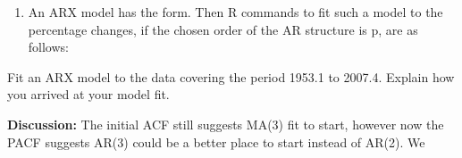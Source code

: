 \documentclass[
]{article}
\newenvironment{Shaded}{\begin{snugshade}}{\end{snugshade}}
\newcommand{\DecValTok}[1]{\textcolor[rgb]{0.00,0.00,0.81}{#1}}
\newcommand{\FunctionTok}[1]{\textcolor[rgb]{0.00,0.00,0.00}{#1}}
\newcommand{\NormalTok}[1]{#1}
\newcommand{\OtherTok}[1]{\textcolor[rgb]{0.56,0.35,0.01}{#1}}
\newcommand{\SpecialCharTok}[1]{\textcolor[rgb]{0.00,0.00,0.00}{#1}}
\providecommand{\tightlist}{%
  \setlength{\itemsep}{0pt}\setlength{\parskip}{0pt}}
\begin{document}
\begin{Shaded}
\end{Shaded}

\begin{enumerate}
\def\labelenumi{(\roman{enumi})}
\setcounter{enumi}{2}
\tightlist
\item
  An ARX model has the form. Then R commands to fit such a model to the
  percentage changes, if the chosen order of the AR structure is p, are
  as follows:
\end{enumerate}

Fit an ARX model to the data covering the period 1953.1 to 2007.4.
Explain how you arrived at your model fit.

\textbf{Discussion:} The initial ACF still suggests MA(3) fit to start,
however now the PACF suggests AR(3) could be a better place to start
instead of AR(2). We

\begin{Shaded}
\end{Shaded}
\end{document}
